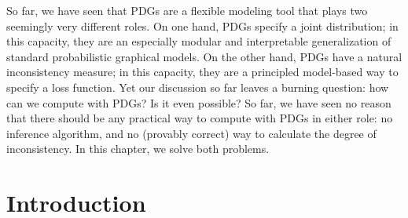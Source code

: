 \label{chap:infer}

\newif\ifvfull
    \vfulltrue %


So far, we have seen that PDGs are a flexible modeling tool that
    plays two seemingly very different roles.
On one hand, PDGs specify a joint distribution; in this capacity, they are an especially modular and interpretable generalization of standard probabilistic graphical models.
On the other hand, PDGs have a natural inconsistency measure; in this capacity, they are a principled model-based way to specify a loss function.
Yet our discussion so far leaves a burning question: how can we compute with PDGs? Is it even possible? 
So far, we have seen no reason that there should be any practical way to compute with PDGs in either role: no inference algorithm, and no (provably correct) way to calculate the degree of inconsistency.
In this chapter, we solve both problems. 

\section{Introduction}

